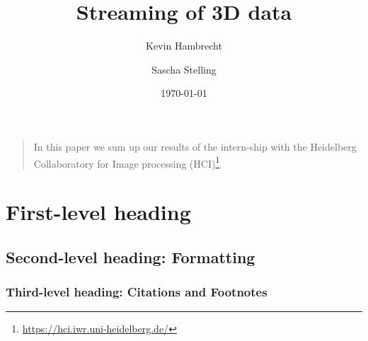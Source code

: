 \documentclass[%
aip,
jmp,
amsmath,amssymb,
reprint,
nofootinbib
]{revtex4-1}
\begin{document}
	
	\title[Report: Streaming of 3D data]{Streaming of 3D data}
	
	\author{Kevin Hambrecht}
	\author{Sascha Stelling}
	\date{\today}
	
	
	\maketitle
	
	\begin{quotation}
		In this paper we sum up our results of the intern-ship with the Heidelberg Collaboratory for Image processing (HCI)\footnote{\url{https://hci.iwr.uni-heidelberg.de/}}
	\end{quotation}
	
	\section{\label{sec:level1}First-level heading}
	
	
	
	\subsection{\label{sec:level2}Second-level heading: Formatting}
	
	
	
	\subsubsection{\label{sec:level3}Third-level heading: Citations and Footnotes}
	
	
	
	
	
\end{document}

